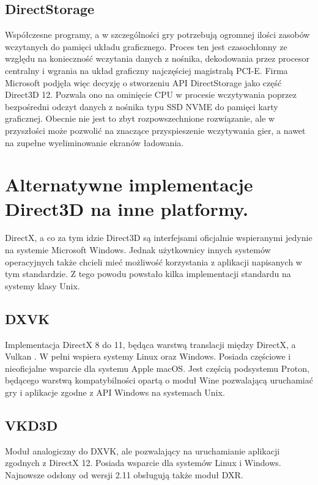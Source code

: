 \subsection{DirectStorage}
Współczesne programy, a w szczególności gry potrzebują ogromnej ilości
zasobów wczytanych do pamięci układu graficznego. Proces ten jest
czasochłonny ze względu na konieczność wczytania danych z nośnika,
dekodowania przez procesor centralny i wgrania na układ graficzny
najczęściej magistralą PCI-E. Firma Microsoft podjęła więc decyzję o stworzeniu API DirectStorage jako
część Direct3D 12. Pozwala ono na ominięcie CPU w procesie wczytywania poprzez
bezpośredni odczyt danych z nośnika typu SSD NVME do pamięci karty
graficznej. Obecnie nie jest to zbyt rozpowszechnione rozwiązanie, ale w
przyszłości może pozwolić na znaczące przyspieszenie wczytywania gier, a
nawet na zupełne wyeliminowanie ekranów ładowania.

\section{Alternatywne implementacje Direct3D na inne platformy.} %

DirectX, a co za tym idzie Direct3D są interfejsami oficjalnie
wspieranymi jedynie na systemie Microsoft Windows. Jednak użytkownicy
innych systemów operacyjnych także chcieli mieć możliwość korzystania z
aplikacji napisanych w tym standardzie. Z tego powodu powstało kilka
implementacji standardu na systemy klasy Unix.

\subsection{DXVK}
Implementacja DirectX 8 do 11, będąca warstwą translacji między DirectX,
a Vulkan \cite{github:dxvk:2024}. W pełni wspiera systemy Linux oraz Windows. Posiada częściowe i nieoficjalne wsparcie dla
systemu Apple macOS. Jest częścią podsystemu Proton, będącego warstwą
kompatybilności opartą o moduł Wine pozwalającą uruchamiać gry i
aplikacje zgodne z API Windows na systemach Unix.

\subsection{VKD3D}
Moduł analogiczny do DXVK, ale pozwalający na uruchamianie aplikacji
zgodnych z DirectX 12. Posiada wsparcie dla systemów Linux i Windows. Najnowsze odsłony od wersji 2.11 obsługują także moduł DXR.